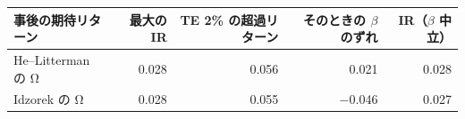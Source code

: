 \begin{tabular}{lrrrr}
\toprule
事後の期待リターン & 最大の IR & TE 2\% の超過リターン & そのときの $\beta$ のずれ & IR（$\beta$ 中立） \\
\midrule
He–Litterman の Ω & 0.028 & 0.056 & 0.021 & 0.028 \\
Idzorek の Ω & 0.028 & 0.055 & \ensuremath{-}0.046 & 0.027 \\
\bottomrule
\end{tabular}
